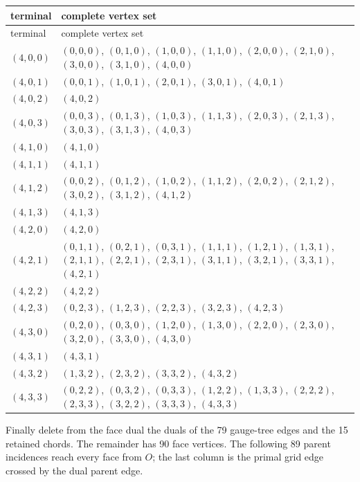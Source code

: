 \begin{longtable}{@{}p{}p{}@{}}
\toprule terminal & complete vertex set\\ \midrule
\endfirsthead \toprule terminal & complete vertex set\\ \midrule \endhead
$(4,0,0)$ & $(0,0,0)$, $(0,1,0)$, $(1,0,0)$, $(1,1,0)$, $(2,0,0)$, $(2,1,0)$, $(3,0,0)$, $(3,1,0)$, $(4,0,0)$\\
$(4,0,1)$ & $(0,0,1)$, $(1,0,1)$, $(2,0,1)$, $(3,0,1)$, $(4,0,1)$\\
$(4,0,2)$ & $(4,0,2)$\\
$(4,0,3)$ & $(0,0,3)$, $(0,1,3)$, $(1,0,3)$, $(1,1,3)$, $(2,0,3)$, $(2,1,3)$, $(3,0,3)$, $(3,1,3)$, $(4,0,3)$\\
$(4,1,0)$ & $(4,1,0)$\\
$(4,1,1)$ & $(4,1,1)$\\
$(4,1,2)$ & $(0,0,2)$, $(0,1,2)$, $(1,0,2)$, $(1,1,2)$, $(2,0,2)$, $(2,1,2)$, $(3,0,2)$, $(3,1,2)$, $(4,1,2)$\\
$(4,1,3)$ & $(4,1,3)$\\
$(4,2,0)$ & $(4,2,0)$\\
$(4,2,1)$ & $(0,1,1)$, $(0,2,1)$, $(0,3,1)$, $(1,1,1)$, $(1,2,1)$, $(1,3,1)$, $(2,1,1)$, $(2,2,1)$, $(2,3,1)$, $(3,1,1)$, $(3,2,1)$, $(3,3,1)$, $(4,2,1)$\\
$(4,2,2)$ & $(4,2,2)$\\
$(4,2,3)$ & $(0,2,3)$, $(1,2,3)$, $(2,2,3)$, $(3,2,3)$, $(4,2,3)$\\
$(4,3,0)$ & $(0,2,0)$, $(0,3,0)$, $(1,2,0)$, $(1,3,0)$, $(2,2,0)$, $(2,3,0)$, $(3,2,0)$, $(3,3,0)$, $(4,3,0)$\\
$(4,3,1)$ & $(4,3,1)$\\
$(4,3,2)$ & $(1,3,2)$, $(2,3,2)$, $(3,3,2)$, $(4,3,2)$\\
$(4,3,3)$ & $(0,2,2)$, $(0,3,2)$, $(0,3,3)$, $(1,2,2)$, $(1,3,3)$, $(2,2,2)$, $(2,3,3)$, $(3,2,2)$, $(3,3,3)$, $(4,3,3)$\\
\bottomrule
\end{longtable}
Finally delete from the face dual the duals of the 79 gauge-tree edges and the 15 retained chords.  The remainder has 90 face vertices.  The following 89 parent incidences reach every face from $O$; the last column is the primal grid edge crossed by the dual parent edge.
